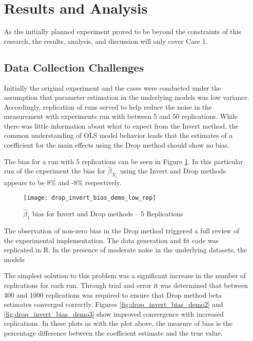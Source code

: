 \documentclass[../paper.tex]{subfiles}
\begin{document}
\section{Results and Analysis}
As the initially planned experiment proved to be beyond the constraints of this research, the results, analysis, and discussion will only cover Case 1.

\subsection{Data Collection Challenges}
Initially the original experiment and the cases were conducted under the assumption that parameter estimation in the underlying models was low variance.
Accordingly, replication of runs served to help reduce the noise in the measurement with experiments run with between 5 and 50 replications.
While there was little information about what to expect from the Invert method, the common understanding of OLS model behavior leads that the estimates of a coefficient for the main effects using the Drop method should show no bias.

The bias for a run with 5 replications can be seen in Figure \ref{fig:drop_invert_bias_demo_low_rep}. In this particular run of the experiment the bias for $\hat{\beta}_{X_{1}}$ using the Invert and Drop methods appears to be 8\% and -8\% respectively.

\begin{figure}[H]

\centering
\texttt{[image: drop\_invert\_bias\_demo\_low\_rep]}
\caption{$\hat{\beta}_{1}$ bias  for Invert and Drop methods -- 5 Replications}
\label{fig:drop_invert_bias_demo_low_rep}
\end{figure}


The observation of non-zero bias in the Drop method triggered a full review of the experimental implementation.
The data generation and fit code was replicated in R.
In the presence of moderate noise in the underlying datasets, the models

The simplest solution to this problem was a significant increase in the number of replications for each run.
Through trial and error it was determined that between 400 and 1000 replications was required to ensure that Drop method beta estimates converged correctly. Figures \ref{fig:drop_invert_bias_demo2} and \ref{fig:drop_invert_bias_demo3} show improved convergence with increased replications. In these plots as with the plot above, the measure of bias is the percentage difference between the coefficient estimate and the true value.
\end{document}
